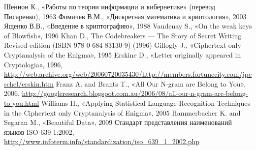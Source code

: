 \begin{thebibliography}{1}
 Шеннон К., «Работы по теории информации и кибернетике» (перевод Писаренко), 1963
 Фомичев В.М., «Дискретная математика и криптология», 2003
 Ященко В.В., «Введение в криптографию», 1988
 Vaudenay S., «On the weak keys of Blowfish», 1996
 Khan D., The Codebreakers --- The Story of Secret Writing Revised edition (ISBN 978-0-684-83130-9) (1996)
 Gillogly J., «Ciphertext only Cryptanalysis of the Enigma», 1995
 Erskine D., «Letter originally appeared in Cryptologia», 1996, \url{http://web.archive.org/web/20060720035430/http://members.fortunecity.com/jpeschel/erskin.htm}
 Franz A. and Brants T., «All Our N-gram are Belong to You», 2006, \url{http://googleresearch.blogspot.com.au/2006/08/all-our-n-gram-are-belong-to-you.html}
 Williams H., «Applying Statistical Language Recognition Techniques in the Ciphertext only Cryptanalysis of Enigma», 2005
 Hammerbacher K. and Segaran M., «Beautiful Data», 2009
 Стандарт представления наименований языков ISO 639-1:2002, \url{http://www.infoterm.info/standardization/iso_639_1_2002.php}
\end{thebibliography}
